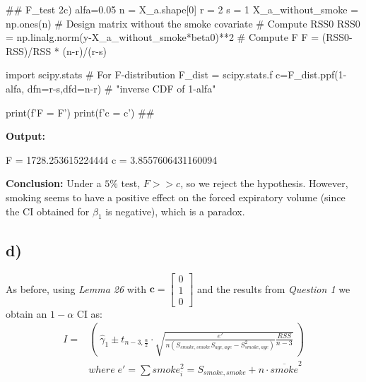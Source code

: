 \documentclass[a4paper]{article}
\begin{document}
\begin{python}
	## F_test 2c)
	alfa=0.05
	n = X_a.shape[0]
	r = 2
	s = 1
	X_a_without_smoke = np.ones(n) # Design matrix without the smoke covariate
	# Compute RSS0
	RSS0 = np.linalg.norm(y-X_a_without_smoke*beta0)**2
	# Compute F	
	F = (RSS0-RSS)/RSS * (n-r)/(r-s)
	
	import scipy.stats # For F-distribution
	F_dist = scipy.stats.f
	c=F_dist.ppf(1-alfa, dfn=r-s,dfd=n-r) # "inverse CDF of 1-alfa"
	
	print(f'F = {F}')
	print(f'c = {c}')
	##
\end{python}
\textbf{Output:}
\begin{python}
	F = 1728.253615224444
	c = 3.8557606431160094
\end{python}
\textbf{Conclusion:} Under a $5\%$ test, $F>>c$, so we reject the hypothesis. However, smoking seems to have a positive effect on the forced expiratory volume (since the CI obtained for $\beta_{1}$ is negative), which is a paradox.

\newpage

\subsection{d)}
As before, using \textit{Lemma 26} with $\textbf{c}=\begin{bmatrix}0 \\ 1 \\ 0 \end{bmatrix}$ and the results from \textit{Question 1} we obtain an $1-\alpha$ CI as: \\
\begin{equation*}
\begin{split}
I = & ( \; \hat{\gamma}_{1} \pm t_{n-3,\frac{\alpha}{2}} \cdot \sqrt{\frac{e'}{n(S_{smoke,smoke}S_{age,age}-S_{smoke,age}^2)}\frac{RSS}{n-3}} \ )\\
& where \; e'= \sum{smoke_{i}^2} = S_{smoke, smoke}+n\cdot\overline{smoke}^2 \\
\end{split}
\end{equation*}
\end{document}
